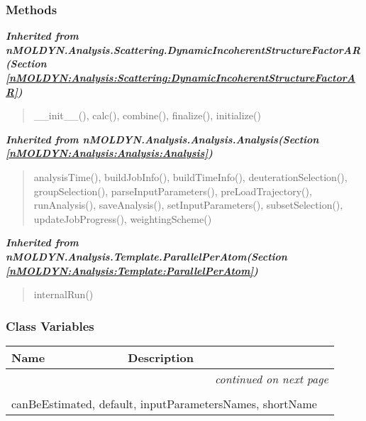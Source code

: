 
  \subsubsection{Methods}


\large{\textbf{\textit{Inherited from nMOLDYN.Analysis.Scattering.DynamicIncoherentStructureFactorAR\textit{(Section \ref{nMOLDYN:Analysis:Scattering:DynamicIncoherentStructureFactorAR})}}}}

\begin{quote}
\_\_init\_\_(), calc(), combine(), finalize(), initialize()
\end{quote}

\large{\textbf{\textit{Inherited from nMOLDYN.Analysis.Analysis.Analysis\textit{(Section \ref{nMOLDYN:Analysis:Analysis:Analysis})}}}}

\begin{quote}
analysisTime(), buildJobInfo(), buildTimeInfo(), deuterationSelection(), groupSelection(), parseInputParameters(), preLoadTrajectory(), runAnalysis(), saveAnalysis(), setInputParameters(), subsetSelection(), updateJobProgress(), weightingScheme()
\end{quote}

\large{\textbf{\textit{Inherited from nMOLDYN.Analysis.Template.ParallelPerAtom\textit{(Section \ref{nMOLDYN:Analysis:Template:ParallelPerAtom})}}}}

\begin{quote}
internalRun()
\end{quote}


  \subsubsection{Class Variables}

    \vspace{-1cm}
\hspace{\varindent}\begin{longtable}{|p{\varnamewidth}|p{\vardescrwidth}|l}
\cline{1-2}
\cline{1-2} \centering \textbf{Name} & \centering \textbf{Description}& \\
\cline{1-2}
\endhead\cline{1-2}\multicolumn{3}{r}{\small\textit{continued on next page}}\\\endfoot\cline{1-2}
\endlastfoot\multicolumn{2}{|l|}{\textit{Inherited from nMOLDYN.Analysis.Scattering.DynamicIncoherentStructureFactorAR \textit{(Section \ref{nMOLDYN:Analysis:Scattering:DynamicIncoherentStructureFactorAR})}}}\\
\multicolumn{2}{|p{\varwidth}|}{\raggedright canBeEstimated, default, inputParametersNames, shortName}\\
\cline{1-2}
\end{longtable}

